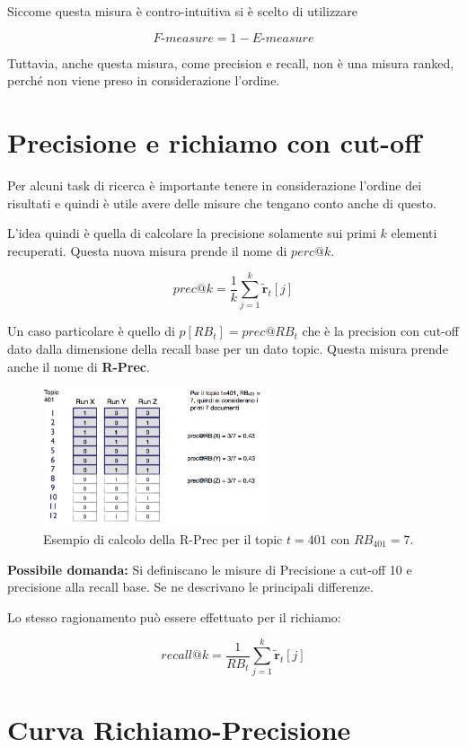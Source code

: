 Siccome questa misura è contro-intuitiva si è scelto di utilizzare

$$
F\text{-}measure = 1 - E\text{-}measure
$$

Tuttavia, anche questa misura, come precision e recall, non è una misura ranked, perché non viene preso in considerazione l'ordine.
\FloatBarrier
\section{Precisione e richiamo con cut-off}

Per alcuni task di ricerca è importante tenere in considerazione l'ordine dei risultati e quindi è utile avere delle misure che tengano conto anche di questo.

L'idea quindi è quella di calcolare la precisione solamente sui primi $k$ elementi recuperati. Questa nuova misura prende il nome di $perc@k$.

$$
prec@k = \frac{1}{k}\sum\limits_{j=1}^{k} \mathbf{\tilde{r}}_t[j]
$$

Un caso particolare è quello di $p[RB_t] = prec@RB_t$ che è la precision con cut-off dato dalla dimensione della recall base per un dato topic. Questa misura prende anche il nome di \textbf{R-Prec}.

\begin{figure}[htbp]
	\centering
	\includegraphics[width=0.6\textwidth]{images/l15-fig-3-1.png}
	\caption{Esempio di calcolo della R-Prec per il topic $t = 401$ con $RB_{401} = 7$.}
\end{figure}

\textbf{{\color{Red} Possibile domanda:}} Si definiscano le misure di Precisione a cut-off 10 e precisione alla recall base. Se ne descrivano le principali differenze.

Lo stesso ragionamento può essere effettuato per il richiamo:

$$
recall@k = \frac{1}{RB_t} \sum\limits_{j=1}^{k} \mathbf{\tilde{r}}_t[j]
$$

\FloatBarrier
\section{Curva Richiamo-Precisione}

